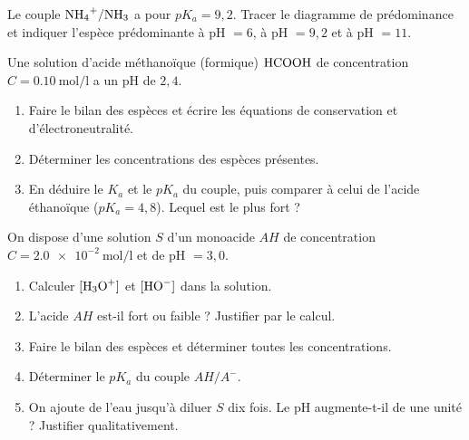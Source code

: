 \exo{} Le couple $\ce{NH4+}/\ce{NH3}$ a pour $pK_a = 9{,}2$. Tracer le
diagramme de prédominance et indiquer l'espèce prédominante à pH $= 6$, à pH $= 9{,}2$
et à pH $= 11$.

\exo{} Une solution d'acide méthanoïque (formique) $\ce{HCOOH}$ de
concentration $C = \SI{0.10}{\mol\per\litre}$ a un pH de $2{,}4$.
\begin{enumerate}[label=\arabic*)]
\item Faire le bilan des espèces et écrire les équations de conservation et
d'électroneutralité.
\item Déterminer les concentrations des espèces présentes.
\item En déduire le $K_a$ et le $pK_a$ du couple, puis comparer à celui de l'acide
éthanoïque ($pK_a = 4{,}8$). Lequel est le plus fort ?
\end{enumerate}


On dispose d'une solution $S$ d'un monoacide $AH$ de concentration
$C = \SI{2.0e-2}{\mol\per\litre}$ et de pH $= 3{,}0$.
\begin{enumerate}[label=\arabic*)]
\item Calculer $[\ce{H3O+}]$ et $[\ce{HO-}]$ dans la solution.
\item L'acide $AH$ est-il fort ou faible ? Justifier par le calcul.
\item Faire le bilan des espèces et déterminer toutes les concentrations.
\item Déterminer le $pK_a$ du couple $AH/A^-$.
\item On ajoute de l'eau jusqu'à diluer $S$ dix fois. Le pH augmente-t-il de une
unité ? Justifier qualitativement.
\end{enumerate}
